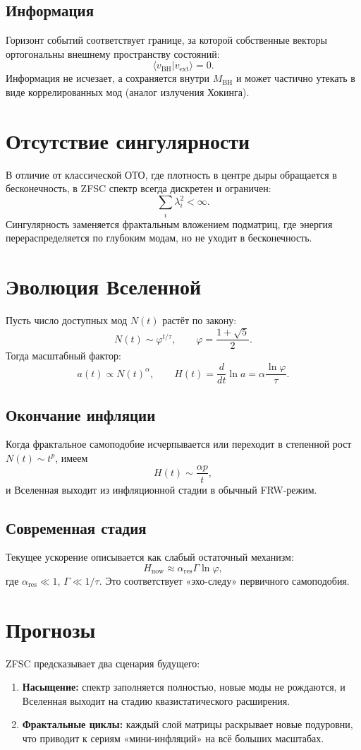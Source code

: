 \documentclass[12pt,a4paper]{article}
\begin{document}
\subsection{Информация}
Горизонт событий соответствует границе, за которой собственные векторы ортогональны внешнему пространству состояний:
\[
\langle v_{\text{BH}} | v_{\text{ext}} \rangle = 0.
\]
Информация не исчезает, а сохраняется внутри $M_{\text{BH}}$ и может частично утекать в виде коррелированных мод (аналог излучения Хокинга).

\section{Отсутствие сингулярности}
В отличие от классической ОТО, где плотность в центре дыры обращается в бесконечность, в ZFSC спектр всегда дискретен и ограничен:
\[
\sum_i \lambda_i^2 < \infty.
\]
Сингулярность заменяется фрактальным вложением подматриц, где энергия перераспределяется по глубоким модам, но не уходит в бесконечность.

\section{Эволюция Вселенной}
Пусть число доступных мод $N(t)$ растёт по закону:
\[
N(t) \sim \varphi^{t/\tau}, \qquad \varphi = \frac{1+\sqrt{5}}{2}.
\]
Тогда масштабный фактор:
\[
a(t) \propto N(t)^{\alpha}, \qquad H(t) = \frac{d}{dt}\ln a = \alpha \frac{\ln \varphi}{\tau}.
\]

\subsection{Окончание инфляции}
Когда фрактальное самоподобие исчерпывается или переходит в степенной рост $N(t) \sim t^p$, имеем
\[
H(t) \sim \frac{\alpha p}{t},
\]
и Вселенная выходит из инфляционной стадии в обычный FRW-режим.

\subsection{Современная стадия}
Текущее ускорение описывается как слабый остаточный механизм:
\[
H_{\text{now}} \approx \alpha_{\text{res}} \Gamma \ln \varphi,
\]
где $\alpha_{\text{res}} \ll 1$, $\Gamma \ll 1/\tau$. 
Это соответствует «эхо-следу» первичного самоподобия.

\section{Прогнозы}
ZFSC предсказывает два сценария будущего:
\begin{enumerate}
  \item \textbf{Насыщение:} спектр заполняется полностью, новые моды не рождаются, и Вселенная выходит на стадию квазистатического расширения.
  \item \textbf{Фрактальные циклы:} каждый слой матрицы раскрывает новые подуровни, что приводит к сериям «мини-инфляций» на всё больших масштабах.
\end{enumerate}
\end{document}

